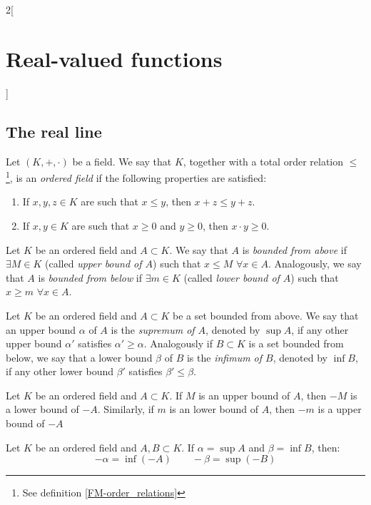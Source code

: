 \documentclass[../../../main.tex]{subfiles}
\begin{document}
\begin{multicols}{2}[\section{Real-valued functions}]
  \subsection{The real line}
  \begin{definition}
    Let $(K,+,\cdot)$ be a field. We say that $K$, together with a total order relation $\leq$\footnote{See definition \ref{FM-order_relations}}, is an \textit{ordered field} if the following properties are satisfied:
    \begin{enumerate}
      \item If $x,y,z\in K$ are such that $x\leq y$, then $x+z\leq y+z$.
      \item If $x,y\in K$ are such that $x\geq0$ and $y\geq0$, then $x\cdot y\geq 0$.
    \end{enumerate}
  \end{definition}
  \begin{definition}
    Let $K$ be an ordered field and $A\subset K$. We say that $A$ is \textit{bounded from above} if $\exists M\in K$ (called \textit{upper bound of $A$}) such that $x\leq M$ $\forall x\in A$. Analogously, we say that $A$ is \textit{bounded from below} if $\exists m\in K$ (called \textit{lower bound of $A$}) such that $x\geq m$ $\forall x\in A$.
  \end{definition}
  \begin{definition}
    Let $K$ be an ordered field and $A\subset K$ be a set bounded from above. We say that an upper bound $\alpha$ of $A$ is the \textit{supremum of $A$}, denoted by $\sup A$, if any other upper bound $\alpha'$ satisfies $\alpha'\geq\alpha$.
    Analogously if $B\subset K$ is a set bounded from below, we say that a lower bound $\beta$ of $B$ is the \textit{infimum of $B$}, denoted by $\inf B$, if any other lower bound $\beta'$ satisfies $\beta'\leq\beta$.
  \end{definition}
  \begin{prop}
    Let $K$ be an ordered field and $A\subset K$. If $M$ is an upper bound of $A$, then $-M$ is a lower bound of $-A$. Similarly, if $m$ is an lower bound of $A$, then $-m$ is a upper bound of $-A$
  \end{prop}
  \begin{prop}
    Let $K$ be an ordered field and $A,B\subset K$. If $\alpha=\sup A$ and $\beta=\inf B$, then: $$-\alpha=\inf(-A)\qquad-\beta=\sup(-B)$$

\end{prop}
\end{multicols}
\end{document}
